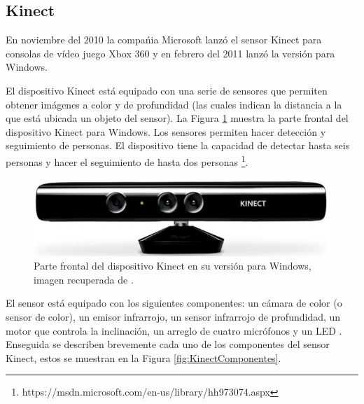 \subsection{Kinect}

En noviembre del 2010 la compa\'nia Microsoft lanz\'o el sensor Kinect para consolas de vídeo juego Xbox 360 y en febrero del 2011 lanz\'o la versi\'on para Windows.   

El dispositivo Kinect está equipado con una serie de sensores que permiten obtener imágenes a color y de profundidad (las cuales indican la distancia a la que está ubicada un objeto del sensor). La Figura \ref{fig:KinectPic} muestra la parte frontal del dispositivo Kinect para Windows. Los sensores permiten hacer detección y seguimiento de personas. El dispositivo tiene la capacidad de detectar hasta seis personas y hacer el seguimiento de hasta dos personas \footnote{https://msdn.microsoft.com/en-us/library/hh973074.aspx}.    
  
\begin{figure}[h!]
\begin{center}
\includegraphics[scale=.65]{./Figures/Kinect.jpg}
\end{center}
\caption{Parte frontal del dispositivo Kinect en su versión para Windows, imagen recuperada de \footnotemark{}.} 
\label{fig:KinectPic}
\end{figure} 


El sensor está equipado con los siguientes componentes: un cámara de color (o sensor de color), un emisor infrarrojo, un sensor infrarrojo de profundidad, un motor que controla la inclinación, un arreglo de cuatro micrófonos y un LED \citep{Jana2013}.
Enseguida se describen brevemente cada uno de los componentes del sensor Kinect, estos se muestran en la Figura \ref{fig:KinectComponentes}. 

